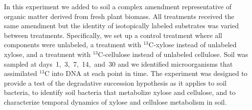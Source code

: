 In this experiment we added to soil a complex amendment representative of organic
matter derived from fresh plant biomass. All treatments received the same
amendment but the identity of isotopically labeled substrates was varied
between treatments. Specifically, we set up a control treatment where all
components were unlabeled, a treatment with $^{13}$C-xylose instead of
unlabeled xylose, and a treatment with $^{13}$C-cellulose instead of unlabeled
cellulose. Soil was sampled at days~1,~3,~7,~14,~and~30 and we identified
microorganisms that assimilated $^{13}$C into DNA at each point in time. The
experiment was designed to provide a test of the degradative succession
hypothesis as it applies to soil bacteria, to identify soil bacteria that
metabolize xylose and cellulose, and to characterize temporal dynamics of
xylose and cellulose metabolism in soil. 
